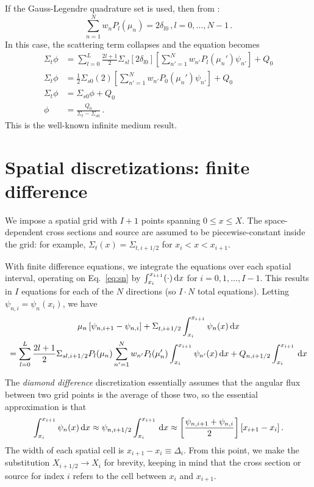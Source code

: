 \documentclass[]{SRJcommon}
\begin{document}
If the Gauss-Legendre quadrature set is used, then from
\cite[p.121]{Lew1984}:
$$ \sum_{n=1}^{N} w_{n} P_{l}(\mu_n) = 2 \delta_{l0} \,, l = 0,\ldots, N-1 \,.$$
In this case, the scattering term collapses and the equation becomes
\begin{align*}
  \Sigma_t \phi 
  &= \sum_{l=0}^{L}  \frac{2l+1}{2} \Sigma_{sl} \left[ 2 \delta_{l0} \right] \left[ \sum_{n'=1}^{N} w_{n'} P_{l} (\mu_n') \psi_{n'}
\right] + Q_0
\\
  \Sigma_t \phi 
  &=  \frac{1}{2} \Sigma_{s0} (2) \left[ \sum_{n'=1}^{N} w_{n'} P_{0} (\mu_n') \psi_{n'}
\right] + Q_0
\\
\Sigma_t \phi 
  &=  \Sigma_{s0} \phi + Q_0
\\
\phi 
&=  \frac{Q_0}{\Sigma_t - \Sigma_{s0}} \,.
\end{align*}
This is the well-known infinite medium result.
\section{Spatial discretizations: finite difference}
We impose a spatial grid with $I+1$ points spanning $0 \le x \le X$. The
space-dependent cross sections and source are assumed to be piecewise-constant
inside the grid: for example, $\Sigma_t(x) = \Sigma_{t,i+1/2}$ for $x_{i} < x
< x_{i+1}$.

With finite difference equations, we integrate the \SN{} equations over each
spatial interval, operating on Eq.~\eqref{eq:sn} by $\int_{x_{i}}^{x_{i+1}}
(\cdot) \, \mathrm{d} x$ for $i = 0,1,\ldots, I-1$.
This results in $I$ equations for each of the $N$ directions (so $I \cdot N$
total equations). Letting $\psi_{n,i} = \psi_n(x_i)$, we have
\begin{multline}
  \mu_n \left[ \psi_{n,i+1} - \psi_{n,i} \right] + \Sigma_{t,i+1/2}
  \int_{x_{i}}^{x_{i+1}} \psi_n(x) \, \mathrm{d} x
\\
= \sum_{l=0}^{L}  \frac{2l+1}{2} \Sigma_{sl,i+1/2} P_{l}(\mu_n)
 \sum_{n'=1}^{N} w_{n'} P_{l} (\mu_n') \int_{x_{i}}^{x_{i+1}} \psi_{n'}(x) \, \mathrm{d} x
  + Q_{n,i+1/2} \int_{x_{i}}^{x_{i+1}} \, \mathrm{d} x
  \label{eq:finitediff}
\end{multline}

The \emph{diamond difference} discretization essentially assumes that the
angular flux between two grid points is the average of those two, so the
essential approximation is that
\begin{equation}
\int_{x_{i}}^{x_{i+1}} \psi_{n}(x) \, \mathrm{d} x
\approx \psi_{n,i+1/2} \int_{x_{i}}^{x_{i+1}}  \, \mathrm{d} x 
\approx  \left[ \frac{\psi_{n,i+1} + \psi_{n,i}}{2} \right] [x_{i+1} - x_{i}]
\,.
  \label{eq:diamondapprox}
\end{equation}
The width of each spatial cell is $x_{i+1} - x_{i} \equiv \Delta_i$. From this
point, we make the substitution $X_{i+1/2} \to X_{i}$ for brevity, keeping in
mind that the cross section or source for index $i$ refers to the cell between
$x_i$ and $x_{i+1}$.
\end{document}
